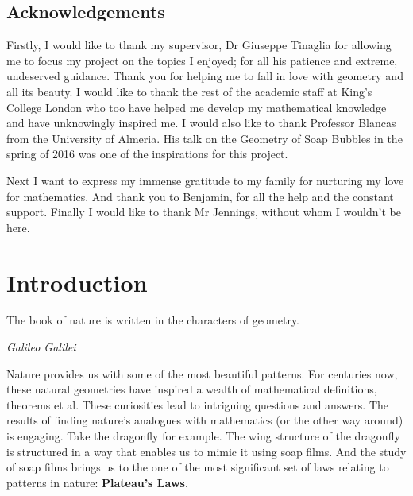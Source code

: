\documentclass[a4paper,12pt]{report}
\begin{document}
\section*{Acknowledgements}

Firstly, I would like to thank my supervisor, Dr Giuseppe Tinaglia for allowing me to focus my project on the topics I enjoyed; for all his patience and extreme, undeserved guidance. Thank you for helping me to fall in love with geometry and all its beauty. I would like to thank the rest of the academic staff at King's College London who too have helped me develop my mathematical knowledge and have unknowingly inspired me. I would also like to thank Professor Blancas from the University of Almeria. His talk on the Geometry of Soap Bubbles in the spring of 2016 was one of the inspirations for this project. \newline 

\hspace{-0.66cm}Next I want to express my immense gratitude to my family for nurturing my love for mathematics. And thank you to Benjamin, for all the help and the constant support.\newline 
\hspace{-0.66cm}Finally I would like to thank Mr Jennings, without whom I wouldn't be here.


\tableofcontents

\newtheorem{theorem}{Theorem}[chapter]
\newtheorem{corollary}[theorem]{Corollary}
\newtheorem{lemma}[theorem]{Lemma}
\newtheorem{definition}[theorem]{Definition}
\newtheorem{remark}[theorem]{Remark}
\newtheorem{example}[theorem]{Example}
\newtheorem{proposition}[theorem]{Proposition}

\chapter{Introduction}



\epigraph{The book of nature is written in the characters of geometry.}{\textit{Galileo Galilei}}

\hspace{-0.66cm}Nature provides us with some of the most beautiful patterns. For centuries now, these natural geometries have inspired a wealth of mathematical definitions, theorems et al. These curiosities lead to intriguing questions and answers. The results of finding nature's analogues with mathematics (or the other way around) is engaging. Take the dragonfly for example. The wing structure of the dragonfly is structured in a way that enables us to mimic it using soap films. And the study of soap films brings us to the one of the most significant set of laws relating to patterns in nature: \textbf{Plateau's Laws}.
\end{document}
